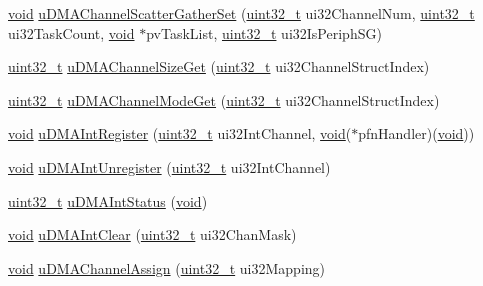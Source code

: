 \begin{DoxyCompactItemize}
\item 
\hyperlink{usb__devapi_8h_afabf60e7f57651d6d595a02c75f07cd0}{void} \hyperlink{group__udma__api_gaac152bd620c5edc6d2d348ac7771c882}{u\+D\+M\+A\+Channel\+Scatter\+Gather\+Set} (\hyperlink{_p_e___types_8h_a33594304e786b158f3fb30289278f5af}{uint32\+\_\+t} ui32\+Channel\+Num, \hyperlink{_p_e___types_8h_a33594304e786b158f3fb30289278f5af}{uint32\+\_\+t} ui32\+Task\+Count, \hyperlink{usb__devapi_8h_afabf60e7f57651d6d595a02c75f07cd0}{void} $\ast$pv\+Task\+List, \hyperlink{_p_e___types_8h_a33594304e786b158f3fb30289278f5af}{uint32\+\_\+t} ui32\+Is\+Periph\+SG)
\item 
\hyperlink{_p_e___types_8h_a33594304e786b158f3fb30289278f5af}{uint32\+\_\+t} \hyperlink{group__udma__api_ga52908962d5fdc8ad21d14a3ebb19c0b9}{u\+D\+M\+A\+Channel\+Size\+Get} (\hyperlink{_p_e___types_8h_a33594304e786b158f3fb30289278f5af}{uint32\+\_\+t} ui32\+Channel\+Struct\+Index)
\item 
\hyperlink{_p_e___types_8h_a33594304e786b158f3fb30289278f5af}{uint32\+\_\+t} \hyperlink{group__udma__api_ga84a74cc2b06a6a59506dcdfabd0c7972}{u\+D\+M\+A\+Channel\+Mode\+Get} (\hyperlink{_p_e___types_8h_a33594304e786b158f3fb30289278f5af}{uint32\+\_\+t} ui32\+Channel\+Struct\+Index)
\item 
\hyperlink{usb__devapi_8h_afabf60e7f57651d6d595a02c75f07cd0}{void} \hyperlink{group__udma__api_ga38e714509554e38d29563bf7832f7098}{u\+D\+M\+A\+Int\+Register} (\hyperlink{_p_e___types_8h_a33594304e786b158f3fb30289278f5af}{uint32\+\_\+t} ui32\+Int\+Channel, \hyperlink{usb__devapi_8h_afabf60e7f57651d6d595a02c75f07cd0}{void}($\ast$pfn\+Handler)(\hyperlink{usb__devapi_8h_afabf60e7f57651d6d595a02c75f07cd0}{void}))
\item 
\hyperlink{usb__devapi_8h_afabf60e7f57651d6d595a02c75f07cd0}{void} \hyperlink{group__udma__api_ga8728732286c8948fd715e58ca04dbd84}{u\+D\+M\+A\+Int\+Unregister} (\hyperlink{_p_e___types_8h_a33594304e786b158f3fb30289278f5af}{uint32\+\_\+t} ui32\+Int\+Channel)
\item 
\hyperlink{_p_e___types_8h_a33594304e786b158f3fb30289278f5af}{uint32\+\_\+t} \hyperlink{group__udma__api_gaf3ef981569462dff3ebcf00f327be60b}{u\+D\+M\+A\+Int\+Status} (\hyperlink{usb__devapi_8h_afabf60e7f57651d6d595a02c75f07cd0}{void})
\item 
\hyperlink{usb__devapi_8h_afabf60e7f57651d6d595a02c75f07cd0}{void} \hyperlink{group__udma__api_gaf06b67b4b30df8188540cd06634c9bb9}{u\+D\+M\+A\+Int\+Clear} (\hyperlink{_p_e___types_8h_a33594304e786b158f3fb30289278f5af}{uint32\+\_\+t} ui32\+Chan\+Mask)
\item 
\hyperlink{usb__devapi_8h_afabf60e7f57651d6d595a02c75f07cd0}{void} \hyperlink{group__udma__api_gaa3c73411a7305843059d0984efaf7770}{u\+D\+M\+A\+Channel\+Assign} (\hyperlink{_p_e___types_8h_a33594304e786b158f3fb30289278f5af}{uint32\+\_\+t} ui32\+Mapping)
\end{DoxyCompactItemize}


